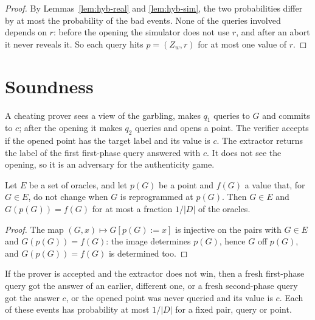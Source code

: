 \begin{proof}
  \leanok
  By Lemmas~\ref{lem:hyb-real} and \ref{lem:hyb-sim}, the two probabilities differ by at most the
  probability of the bad events. None of the queries involved depends on $r$: before the opening
  the simulator does not use $r$, and after an abort it never reveals it. So each query hits
  $p = (Z_w, r)$ for at most one value of $r$.
\end{proof}

\section{Soundness}

\begin{definition}
  \label{def:bind}
  \leanok
  A cheating prover sees a view of the garbling, makes $q_1$ queries to $G$ and commits to $c$;
  after the opening it makes $q_2$ queries and opens a point. The verifier accepts if the opened
  point has the target label and its value is $c$. The extractor returns the label of the first
  first-phase query answered with $c$. It does not see the opening, so it is an adversary for the
  authenticity game.
\end{definition}

\begin{lemma}
  \label{lem:fresh}
  \leanok
  Let $E$ be a set of oracles, and let $p(G)$ be a point and $f(G)$ a value that, for $G \in E$, do
  not change when $G$ is reprogrammed at $p(G)$. Then $G \in E$ and $G(p(G)) = f(G)$ for at most a
  fraction $1/|D|$ of the oracles.
\end{lemma}

\begin{proof}
  \leanok
  The map $(G, x) \mapsto G[p(G) := x]$ is injective on the pairs with $G \in E$ and
  $G(p(G)) = f(G)$: the image determines $p(G)$, hence $G$ off $p(G)$, and $G(p(G)) = f(G)$ is
  determined too.
\end{proof}

\begin{lemma}
  \label{lem:bad-of-accept}
  \leanok
  If the prover is accepted and the extractor does not win, then a fresh first-phase query got the
  answer of an earlier, different one, or a fresh second-phase query got the answer $c$, or the opened point was
  never queried and its value is $c$. Each of these events has probability at most $1/|D|$ for a
  fixed pair, query or point.
\end{lemma}

